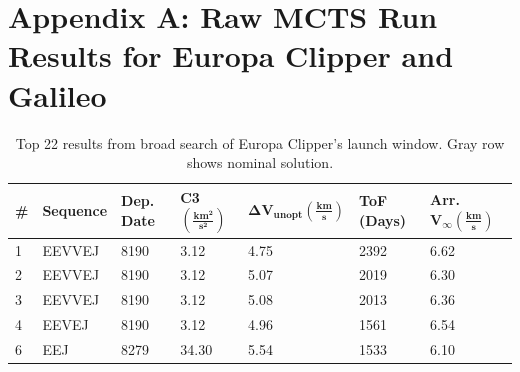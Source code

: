 \documentclass[letterpaper, paper,11pt]{AAS}	%
\begin{document}
\appendix
\clearpage
\section*{Appendix A: Raw MCTS Run Results for Europa Clipper and Galileo}

\begin{table}[h!]
    \centering
    \caption{Top 22 results from broad search of Europa Clipper's launch window. Gray row shows nominal solution.}
    \begin{tabular}{lllllll}
        \toprule
        \textbf{\textbf{\#}}\hspace{2em} & \textbf{\textbf{Sequence}} & \textbf{Dep. Date}\footnotemark[1] & \textbf{\textbf{C3} $\boldsymbol{(\frac{km^2}{s^2})}$} & \textbf{$\boldsymbol{\Delta V_{unopt} (\frac{km}{s})}$} & \textbf{\textbf{ToF (Days) }} & \textbf{\textbf{Arr.} $\boldsymbol{V_\infty (\frac{km}{s})}$} \\
        \midrule
        1                           & EEVVEJ                     & 8190                            & 3.12                                                   & 4.75                                                    & 2392                       & 6.62                                                             \\
        2                           & EEVVEJ                     & 8190                            & 3.12                                                   & 5.07                                                    & 2019                       & 6.30                                                             \\
        3                           & EEVVEJ                     & 8190                            & 3.12                                                   & 5.08                                                    & 2013                       & 6.36                                                             \\
        4                           & EEVEJ                      & 8190                            & 3.12                                                   & 4.96                                                    & 1561                       & 6.54                                                             \\
        6                           & EEJ                        & 8279                            & 34.30                                                  & 5.54                                                    & 1533                       & 6.10                                                             \\

\end{tabular}
\end{table}
\end{document}
